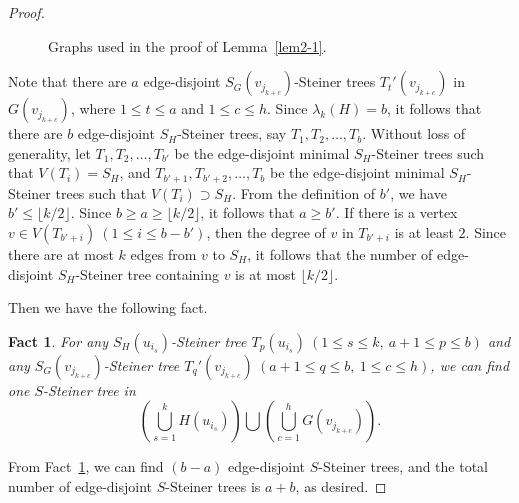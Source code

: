 \documentclass[10pt,a4paper]{amsart}
\newtheorem{fact}{Fact}
\begin{document}
\begin{proof}
\begin{figure}[tbp]
\centering

\caption{Graphs used in the proof of Lemma~\ref{lem2-1}.}
\label{fig:lemma-1}
\end{figure}


Note that there are $a$ edge-disjoint $S_G(v_{j_{k+c}})$-Steiner
trees $T_t'(v_{j_{k+c}})$ in $G(v_{j_{k+c}})$, where $1\leq t\leq a$
and $1\leq c\leq h$. Since $\lambda_k(H)=b$, it follows that there
are $b$ edge-disjoint $S_H$-Steiner trees, say $T_1, T_2,\ldots,
T_b$. Without loss of generality, let $T_1, T_2,\ldots, T_{b'}$ be
the edge-disjoint minimal $S_H$-Steiner trees such that
$V(T_i)=S_H$, and $T_{b'+1}, T_{b'+2},\ldots, T_{b}$ be the
edge-disjoint minimal $S_H$-Steiner trees such that $V(T_i)\supset
S_H$. From the definition of $b'$, we have $b'\leq \lfloor
k/2\rfloor$. Since $b\geq a\geq \lfloor k/2\rfloor$, it follows that
$a\geq b'$. If there is a vertex $v\in V(T_{b'+i}) \ (1\leq i\leq
b-b')$, then the degree of $v$ in $T_{b'+i}$ is at least $2$. Since
there are at most $k$ edges from $v$ to $S_H$, it follows that the
number of edge-disjoint $S_H$-Steiner tree containing $v$ is at most
$\lfloor k/2\rfloor$.


Then we have the following fact.

\begin{fact}\label{fact2}
For any $S_H(u_{i_s})$-Steiner tree $T_p(u_{i_s}) \ (1\leq s\leq k,
\ a+1\leq p\leq b)$ and any $S_G(v_{j_{k+c}})$-Steiner tree
$T_q'(v_{j_{k+c}}) \ (a+1\leq q\leq b, \ 1\leq c\leq h)$, we can
find one $S$-Steiner tree in
\[
\left(\bigcup_{s=1}^{k}H(u_{i_s})\right)\bigcup
\left(\bigcup_{c=1}^{h}G(v_{j_{k+c}})\right).
\]
\end{fact}

From Fact~\ref{fact2}, we can find $(b-a)$ edge-disjoint $S$-Steiner
trees, and the total number of edge-disjoint $S$-Steiner trees is
$a+b$, as desired.
\end{proof}
\end{document}

